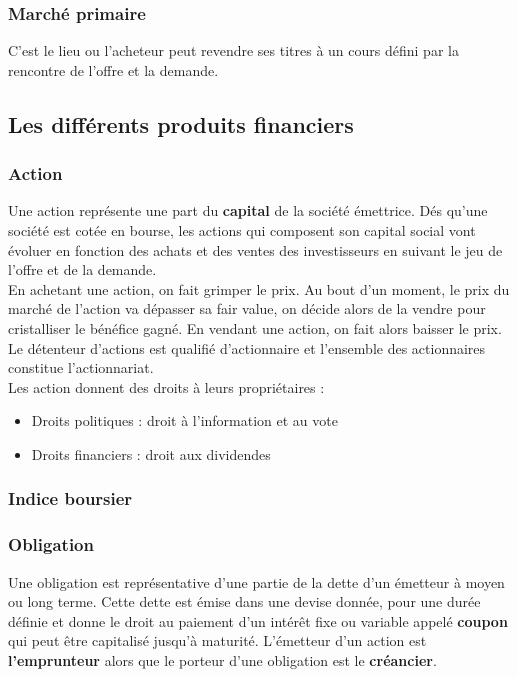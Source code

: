 \subsubsection{Marché primaire}
C'est le lieu ou l'acheteur peut revendre ses titres à un cours défini par la rencontre de l'offre et la demande. 

\subsection{Les différents produits financiers}

\subsubsection{Action}
Une action représente une part du \textbf{capital} de la société émettrice. Dés qu'une société est cotée en bourse, les actions qui composent son capital social vont évoluer en fonction des achats et des ventes des investisseurs en suivant le jeu de l'offre et de la demande.  \\
En achetant une action, on fait grimper le prix. Au bout d’un moment, le prix du marché de l’action va dépasser sa fair value, on décide alors de la vendre pour cristalliser le bénéfice gagné. En vendant une action, on fait alors baisser le prix.\\ 

Le détenteur d'actions est qualifié d'actionnaire et l'ensemble des actionnaires constitue l'actionnariat. \\


Les action donnent des droits à leurs propriétaires : 
\begin{itemize}
\item Droits politiques : droit à l'information et au vote
\item Droits financiers : droit aux dividendes
\end{itemize}

\subsubsection{Indice boursier}

\subsubsection{Obligation}
Une obligation est représentative d'une partie de la dette d'un émetteur à moyen ou long terme. Cette dette est émise dans une devise donnée, pour une durée définie et donne le droit au paiement d'un intérêt fixe ou variable appelé \textbf{coupon} qui peut être capitalisé jusqu'à maturité. L'émetteur d'un action est \textbf{l'emprunteur} alors que le porteur d'une obligation est le \textbf{créancier}. \\

